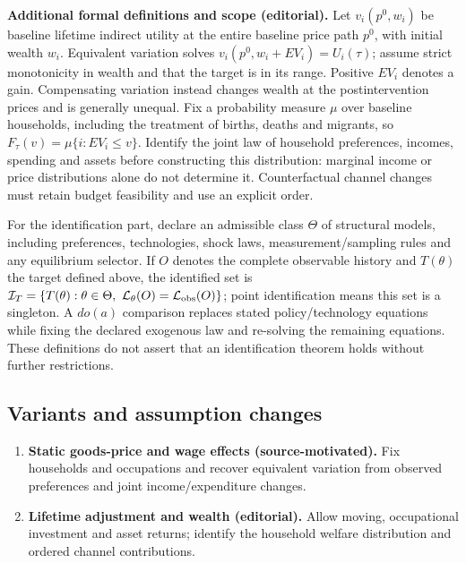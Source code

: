 \documentclass[11pt,a4paper]{article}
\begin{document}
\textbf{Additional formal definitions and scope (editorial).} Let \(v_i(p^0,w_i)\) be baseline lifetime indirect utility at the entire baseline price path \(p^0\), with initial wealth \(w_i\). Equivalent variation solves \(v_i(p^0,w_i+EV_i)=U_i(\tau)\); assume strict monotonicity in wealth and that the target is in its range. Positive \(EV_i\) denotes a gain. Compensating variation instead changes wealth at the postintervention prices and is generally unequal. Fix a probability measure \(\mu\) over baseline households, including the treatment of births, deaths and migrants, so \(F_\tau(v)=\mu\{i:EV_i\leq v\}\). Identify the joint law of household preferences, incomes, spending and assets before constructing this distribution: marginal income or price distributions alone do not determine it. Counterfactual channel changes must retain budget feasibility and use an explicit order.

For the identification part, declare an admissible class \(\Theta\) of structural models, including preferences, technologies, shock laws, measurement/sampling rules and any equilibrium selector. If \(O\) denotes the complete observable history and \(T(\theta)\) the target defined above, the identified set is \(\mathcal I_T=\{T(\theta):\theta\in\Theta,\ \mathcal L_\theta(O)=\mathcal L_{\rm obs}(O)\}\); point identification means this set is a singleton. A \(do(a)\) comparison replaces stated policy/technology equations while fixing the declared exogenous law and re-solving the remaining equations. These definitions do not assert that an identification theorem holds without further restrictions.
\subsection*{Variants and assumption changes}
\begin{enumerate}
\item \textbf{Static goods-price and wage effects (source-motivated).} Fix households and occupations and recover equivalent variation from observed preferences and joint income/expenditure changes.
\item \textbf{Lifetime adjustment and wealth (editorial).} Allow moving, occupational investment and asset returns; identify the household welfare distribution and ordered channel contributions.
\end{enumerate}
\end{document}
